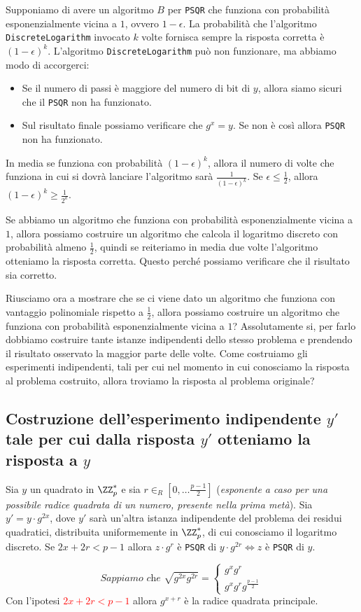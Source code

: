 Supponiamo di avere un algoritmo $B$ per \texttt{PSQR} che funziona con probabilità 
esponenzialmente vicina a $1$, ovvero $1 - \epsilon$. La probabilità che l'algoritmo
\texttt{DiscreteLogarithm} invocato $k$ volte fornisca sempre la risposta corretta
è $(1 - \epsilon)^{k}$. L'algoritmo \texttt{DiscreteLogarithm} può non funzionare, 
ma abbiamo modo di accorgerci:
\begin{itemize}
  \item Se il numero di passi è maggiore del numero di bit di $y$, allora
  siamo sicuri che il \texttt{PSQR} non ha funzionato.
  \item Sul risultato finale possiamo verificare che $g^x = y$. Se non è così
  allora \texttt{PSQR} non ha funzionato.
\end{itemize}
In media se funziona con probabilità $(1 - \epsilon)^k$, allora il numero di volte
che funziona in cui si dovrà lanciare l'algoritmo sarà 
$\frac{1}{(1 - \epsilon)^k}$.
Se $\epsilon \leq \frac{1}{2}$, allora $(1 - \epsilon)^k \geq \frac{1}{2^k}$.
\begin{tcolorbox}
  Se abbiamo un algoritmo che funziona con probabilità esponenzialmente vicina a $1$,
  allora possiamo costruire un algoritmo che calcola il logaritmo discreto con probabilità 
  almeno $\frac{1}{2}$, quindi se reiteriamo in media due volte l'algoritmo otteniamo la 
  risposta corretta. Questo perché possiamo verificare che il risultato sia corretto.
\end{tcolorbox}
Riusciamo ora a mostrare che se ci viene dato un algoritmo che funziona con vantaggio
polinomiale rispetto a $\frac{1}{2}$, allora possiamo costruire un algoritmo che funziona
con probabilità esponenzialmente vicina a $1$? Assolutamente si, per farlo dobbiamo costruire 
tante istanze indipendenti dello stesso problema e prendendo il risultato osservato la 
maggior parte delle volte.
Come costruiamo gli esperimenti indipendenti, tali per cui nel momento in cui conosciamo la 
risposta al problema costruito, allora troviamo la risposta al problema originale?
\subsection{Costruzione dell'esperimento indipendente $y'$ tale per cui dalla risposta 
$y'$ otteniamo la risposta a $y$}
\begin{theorem}
Sia $y$ un quadrato in $\ZZ_p^*$ e sia $r \in_R \left[ 0,\dots \frac{p-1}{2}\right]$ (\textit{esponente a 
caso per una possibile radice quadrata di un numero, presente nella prima metà}). Sia $y' = y \cdot g^{2x}$, 
dove $y'$ sarà un'altra istanza indipendente del problema dei 
residui quadratici, distribuita uniformemente in $\ZZ_p^*$, di cui conosciamo il logaritmo 
discreto. 
Se $2x + 2r < p - 1$ allora $z \cdot g^r$ è \texttt{PSQR} di $y \cdot g^{2r} 
\iff z$ è \texttt{PSQR} di $y$.
\end{theorem}
\[
    \textit{Sappiamo che } \sqrt{g^{2x} g^{2r}} = 
    \begin{cases}
      g^{x} g^{r}\\
      g^{x} g^{r} g^{\frac{p - 1}{2}}
  \end{cases}
\]
Con l'ipotesi \textcolor{red}{$2x + 2r < p - 1$} allora $g^{x+r}$ è la 
radice quadrata principale.

